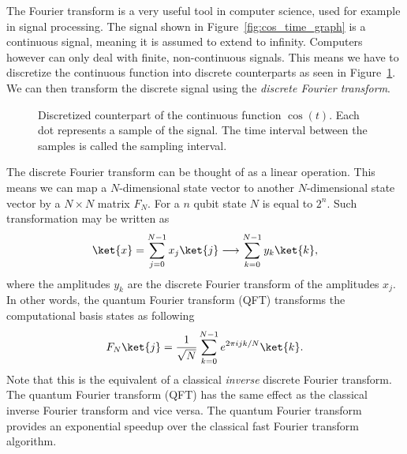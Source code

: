The Fourier transform is a very useful tool in computer science, used for example in signal processing. The signal shown in Figure~\ref{fig:cos_time_graph} is a continuous signal, meaning it is assumed to extend to infinity. Computers however can only deal with finite, non-continuous signals. This means we have to discretize the continuous function into discrete counterparts as seen in Figure~\ref{fig:cos_discrete_time_graph}. We can then transform the discrete signal using the \emph{discrete Fourier transform}.
\begin{figure}[ht]
  \centering
  \caption{Discretized counterpart of the continuous function $\cos(t)$. Each dot represents a sample of the signal. The time interval between the samples is called the sampling interval.}
  \label{fig:cos_discrete_time_graph}
\end{figure}

The discrete Fourier transform can be thought of as a linear operation. This means we can map a $N$-dimensional state vector to another $N$-dimensional state vector by a $N \times N$ matrix $F_N$. For a $n$ qubit state $N$ is equal to $2^n$. Such transformation may be written as
\begin{equation}
  \ket{x} = \sum_{j=0}^{N-1}x_j\ket{j} \longrightarrow \sum_{k=0}^{N-1}y_k\ket{k},
\end{equation}
where the amplitudes $y_k$ are the discrete Fourier transform of the amplitudes $x_j$. In other words, the quantum Fourier transform (QFT) transforms the computational basis states as following
\begin{equation} \label{eq:qft}
  F_N\ket{j} = \dfrac{1}{\sqrt N}\sum_{k=0}^{N-1}e^{2\pi i jk/N}\ket{k}.
\end{equation}
Note that this is the equivalent of a classical \emph{inverse} discrete Fourier transform. The quantum Fourier transform (QFT) has the same effect as the classical inverse Fourier transform and vice versa. The quantum Fourier transform provides an exponential speedup over the classical fast Fourier transform algorithm.

